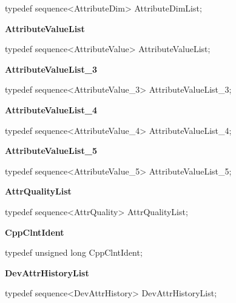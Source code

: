 typedef sequence<AttributeDim> AttributeDimList;\\

\begin{flushleft}
\textbf{AttributeValueList}
\par\end{flushleft}

typedef sequence<AttributeValue> AttributeValueList;\\

\begin{flushleft}
\textbf{AttributeValueList\_3}
\par\end{flushleft}

typedef sequence<AttributeValue\_3> AttributeValueList\_3;\\

\begin{flushleft}
\textbf{AttributeValueList\_4}
\par\end{flushleft}

typedef sequence<AttributeValue\_4> AttributeValueList\_4;\\

\begin{flushleft}
\textbf{AttributeValueList\_5}
\par\end{flushleft}

typedef sequence<AttributeValue\_5> AttributeValueList\_5;\\

\begin{flushleft}
\textbf{AttrQualityList}
\par\end{flushleft}

typedef sequence<AttrQuality> AttrQualityList;\\

\begin{flushleft}
\textbf{CppClntIdent}
\par\end{flushleft}

typedef unsigned long CppClntIdent;\\

\begin{flushleft}
\textbf{DevAttrHistoryList}
\par\end{flushleft}

typedef sequence<DevAttrHistory> DevAttrHistoryList;\\

